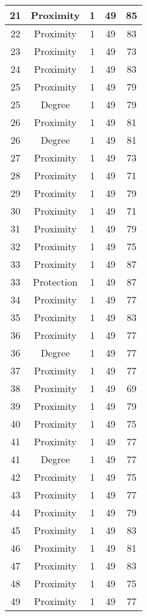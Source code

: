 \documentclass[results.tex]{subfiles}
\begin{document}
\begin{center}
\begin{tabular}{| c || c | c | c | c |}
    \hline
    21 & Proximity & 1 & 49 & 85 \\ 
    \hline
    22 & Proximity & 1 & 49 & 83 \\ 
    \hline
    23 & Proximity & 1 & 49 & 73 \\ 
    \hline
    24 & Proximity & 1 & 49 & 83 \\ 
    \hline
    25 & Proximity & 1 & 49 & 79 \\ 
    \hline
    25 & Degree & 1 & 49 & 79 \\ 
    \hline
    26 & Proximity & 1 & 49 & 81 \\ 
    \hline
    26 & Degree & 1 & 49 & 81 \\ 
    \hline
    27 & Proximity & 1 & 49 & 73 \\ 
    \hline
    28 & Proximity & 1 & 49 & 71 \\ 
    \hline
    29 & Proximity & 1 & 49 & 79 \\ 
    \hline
    30 & Proximity & 1 & 49 & 71 \\ 
    \hline
    31 & Proximity & 1 & 49 & 79 \\ 
    \hline
    32 & Proximity & 1 & 49 & 75 \\ 
    \hline
    33 & Proximity & 1 & 49 & 87 \\ 
    \hline
    33 & Protection & 1 & 49 & 87 \\ 
    \hline
    34 & Proximity & 1 & 49 & 77 \\ 
    \hline
    35 & Proximity & 1 & 49 & 83 \\ 
    \hline
    36 & Proximity & 1 & 49 & 77 \\ 
    \hline
    36 & Degree & 1 & 49 & 77 \\ 
    \hline
    37 & Proximity & 1 & 49 & 77 \\ 
    \hline
    38 & Proximity & 1 & 49 & 69 \\ 
    \hline
    39 & Proximity & 1 & 49 & 79 \\ 
    \hline
    40 & Proximity & 1 & 49 & 75 \\ 
    \hline
    41 & Proximity & 1 & 49 & 77 \\ 
    \hline
    41 & Degree & 1 & 49 & 77 \\ 
    \hline
    42 & Proximity & 1 & 49 & 75 \\ 
    \hline
    43 & Proximity & 1 & 49 & 77 \\ 
    \hline
    44 & Proximity & 1 & 49 & 79 \\ 
    \hline
    45 & Proximity & 1 & 49 & 83 \\ 
    \hline
    46 & Proximity & 1 & 49 & 81 \\ 
    \hline
    47 & Proximity & 1 & 49 & 83 \\ 
    \hline
    48 & Proximity & 1 & 49 & 75 \\ 
    \hline
    49 & Proximity & 1 & 49 & 77 \\ 
    \hline   \end{tabular}
\end{center}
\end{document}

